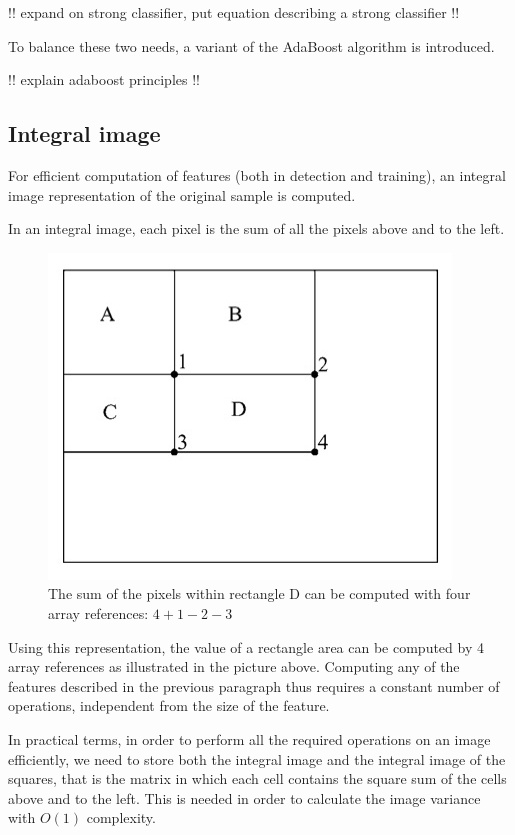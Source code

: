 \documentclass[a4paper,12pt,titlepage]{article}
\begin{document}
!! expand on strong classifier, put equation describing a strong classifier !!

To balance these two needs, a variant of the AdaBoost algorithm is introduced.

!! explain adaboost principles !!

\subsection{Integral image}
For efficient computation of features (both in detection and training), an
integral image representation of the original sample is computed.

In an integral image, each pixel is the sum of all the pixels above and to the
left.

\begin{figure}[h]
  \centering
  \includegraphics[scale=1]{area_sum_integral_image.jpg}
  \caption{The sum of the pixels within rectangle D can be computed with four
  array references: $4+1-2-3$}
  \label{fig:area_sum}
\end{figure}

Using this representation, the value of a rectangle area can be computed by 4
array references as illustrated in the picture above. Computing any of the
features described in the previous paragraph thus requires a constant number of
operations, independent from the size of the feature.

In practical terms, in order to perform all the required operations on an image
efficiently, we need to store both the integral image and the integral image of
the squares, that is the matrix in which each cell contains the square sum of
the cells above and to the left. This is needed in order to calculate the image
variance with $O(1)$ complexity.
\end{document}
